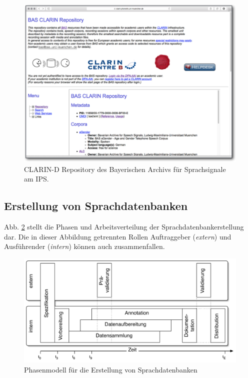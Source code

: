 \documentclass[11pt]{book}
\begin{document}
\begin{figure}[htbp]
\begin{center}
\includegraphics[width=1\textwidth]{grafiken/sprachdatenbanken/bas-repository}
\caption{CLARIN-D Repository des Bayerischen Archivs für Sprachsignale am IPS.}
\label{fig_sdb_datenzentren}
\end{center}
\end{figure}

\subsection*{Erstellung von Sprachdatenbanken}
Abb. \ref{fig_sdb_phasenmodell} stellt die Phasen und Arbeitsverteilung der Sprachdatenbankerstellung dar. Die in dieser Abbildung getrennten Rollen Auftraggeber ({\em extern}) und Ausführender ({\em intern}) können auch zusammenfallen.

\begin{figure}[htbp]
\begin{center}
\includegraphics[width=1\textwidth]{grafiken/sprachdatenbanken/corpus-phasemodel-de}
\caption{Phasenmodell für die Erstellung von Sprachdatenbanken}
\label{fig_sdb_phasenmodell}
\end{center}
\end{figure}
\end{document}
